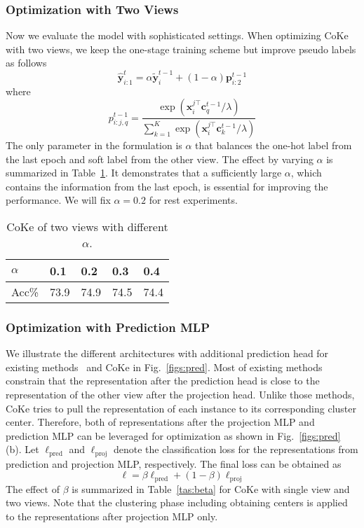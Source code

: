 \documentclass[10pt,twocolumn,letterpaper]{article}
\def \x {\mathbf{x}}
\def \cc {\mathbf{c}}
\def \y {\mathbf{y}}
\def \y {\mathbf{y}}
\def \p {\mathbf{p}}
\begin{document}
\subsubsection{Optimization with Two Views}
Now we evaluate the model with sophisticated settings. When optimizing CoKe with two views, we keep the one-stage training scheme but improve pseudo labels as follows
\[\hat{\y}_{i:1}^{t} = \alpha\tilde{\y}_i^{t-1} + (1-\alpha)\p_{i:2}^{t-1}\]
where 
\[p_{i:j,q}^{t-1} = \frac{\exp(\x_i^{j\top} \cc_{q}^{t-1}/\lambda)}{\sum_{k=1}^K \exp(\x_i^{j\top} \cc_{k}^{t-1}/\lambda)}\]
The only parameter in the formulation is $\alpha$ that balances the one-hot label from the last epoch and soft label from the other view. The effect by varying $\alpha$ is summarized in Table~\ref{tas:alpha}. It demonstrates that a sufficiently large $\alpha$, which contains the information from the last epoch, is essential for improving the performance. We will fix $\alpha=0.2$ for rest experiments. 

\begin{table}[!ht]
\centering
\begin{tabular}{|l|l|l|l|l|}\hline
$\alpha$&0.1&0.2&0.3&0.4\\\hline
Acc\% &73.9&74.9&74.5&74.4 \\\hline
\end{tabular}
\caption{CoKe of two views with different $\alpha$.}\label{tas:alpha}
\end{table}



\subsubsection{Optimization with Prediction MLP}
We illustrate the different architectures with additional prediction head for existing methods~\cite{GrillSATRBDPGAP20, ChenKSNH20} and CoKe in Fig.~\ref{figs:pred}. Most of existing methods constrain that the representation after the prediction head is close to the representation of the other view after the projection head. Unlike those methods, CoKe tries to pull the representation of each instance to its corresponding cluster center. Therefore, both of representations after the projection MLP and prediction MLP can be leveraged for optimization as shown in Fig.~\ref{figs:pred} (b). Let $\ell_{\mathrm{pred}}$ and $\ell_{\mathrm{proj}}$ denote the classification loss for the representations from prediction and projection MLP, respectively. The final loss can be obtained as 
\[\ell = \beta \ell_{\mathrm{pred}} + (1-\beta) \ell_{\mathrm{proj}}\]
The effect of $\beta$ is summarized in Table~\ref{tas:beta} for CoKe with single view and two views. Note that the clustering phase including obtaining centers is applied to the representations after projection MLP only.
\end{document}
